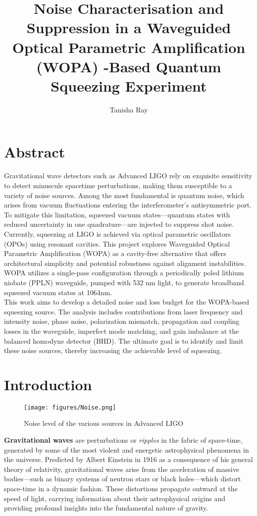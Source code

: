 \documentclass[colorlinks=true,pdfstartview=FitV,linkcolor=blue,
citecolor=red,urlcolor=magenta]{ligodoc}
\title{\large{ Noise Characterisation and Suppression in a Waveguided Optical Parametric Amplification (WOPA) -Based Quantum Squeezing Experiment}}
\author{Tanisha Ray}
\begin{document}
\tableofcontents


\newpage

\section{Abstract}
Gravitational wave detectors such as Advanced LIGO rely on exquisite sensitivity to detect minuscule spacetime perturbations, making them susceptible to a variety of noise sources. Among the most fundamental is quantum noise, which arises from vacuum fluctuations entering the interferometer’s antisymmetric port. To mitigate this limitation, squeezed vacuum states—quantum states with reduced uncertainty in one quadrature—are injected to suppress shot noise. Currently, squeezing at LIGO is achieved via optical parametric oscillators (OPOs) using resonant cavities. This project explores Waveguided Optical Parametric Amplification (WOPA) as a cavity-free alternative that offers architectural simplicity and potential robustness against alignment instabilities. WOPA utilizes a single-pass configuration through a periodically poled lithium niobate (PPLN) waveguide, pumped with 532 nm light, to generate broadband squeezed vacuum states at 1064nm. \\
This work aims to develop a detailed noise and loss budget for the WOPA-based squeezing source. The analysis includes contributions from laser frequency and intensity noise, phase noise, polarization mismatch, propagation and coupling losses in the waveguide, imperfect mode matching, and gain imbalance at the balanced homodyne detector (BHD). The ultimate goal is to identify and limit these noise sources, thereby increasing the achievable level of squeezing. 
\section{Introduction}
\begin{figure}[H]
    \centering
    \texttt{[image: figures/Noise.png]}
   \caption{Noise level of the various sources in Advanced LIGO \cite{mckenzie}}
    \label{fig:enter-label}
\end{figure}
\textbf{Gravitational waves} are perturbations or \textit{ripples} in the fabric of space-time, generated by some of the most violent and energetic astrophysical phenomena in the universe. Predicted by Albert Einstein in 1916 as a consequence of his general theory of relativity, gravitational waves arise from the acceleration of massive bodies—such as binary systems of neutron stars or black holes—which distort space-time in a dynamic fashion. These distortions propagate outward at the speed of light, carrying information about their astrophysical origins and providing profound insights into the fundamental nature of gravity.
\end{document}
